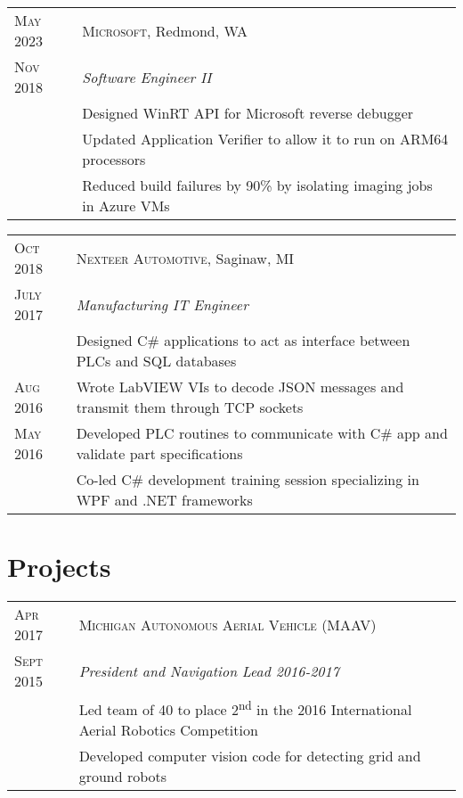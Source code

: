 \documentclass[a4paper,12pt]{article} %
\begin{document}

\begin{tabular}{R{2.1cm}|L{13.0cm}}
\textsc{May 2023} & \textsc{Microsoft}, Redmond, WA \\
\textsc{Nov 2018} & \emph{Software Engineer II} \\
& \footnotesize{Designed WinRT API for Microsoft reverse debugger} \\
& \footnotesize{Updated Application Verifier to allow it to run on ARM64 processors} \\
& \footnotesize{Reduced build failures by 90\% by isolating imaging jobs in
  Azure VMs} \\
\end{tabular}


\begin{tabular}{R{2.1cm}|L{13.0cm}}
\textsc{Oct 2018} & \textsc{Nexteer Automotive}, Saginaw, MI \\
\textsc{July 2017} & \emph{Manufacturing IT Engineer} \\
& \footnotesize{Designed C\# applications to act as interface
  between PLCs and SQL databases} \\
\textsc{Aug 2016} & \footnotesize{Wrote LabVIEW VIs to decode JSON messages
  and transmit them through TCP sockets}\\
\textsc{May 2016} & \footnotesize{Developed PLC routines to communicate with C\#
  app and validate part specifications} \\
& \footnotesize{Co-led C\# development training session specializing in WPF and
 .NET frameworks}\\
\end{tabular}


\section{Projects}

\begin{tabular}{R{2.1cm}|L{13.0cm}}
\textsc{Apr 2017} & \textsc{Michigan Autonomous Aerial Vehicle (MAAV)} \\
\textsc{Sept 2015} & \emph{President and Navigation Lead 2016-2017} \\
& \footnotesize{Led team of 40 to place 2\textsuperscript{nd} in the 2016
  International Aerial Robotics Competition} \\
& \footnotesize{Developed computer vision code for detecting grid and ground robots} \\
\end{tabular}
\end{document}
